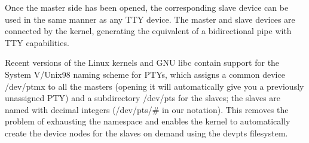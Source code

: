 Once the master side has been opened, the corresponding slave device
can be used in the same manner as any TTY device.  The master and
slave devices are connected by the kernel, generating the equivalent
of a bidirectional pipe with TTY capabilities.

Recent versions of the Linux kernels and GNU libc contain support for
the System V/Unix98 naming scheme for PTYs, which assigns a common
device {\file /dev/ptmx\/} to all the masters (opening it will
automatically give you a previously unassigned PTY) and a subdirectory
{\file /dev/pts\/} for the slaves; the slaves are named with decimal
integers ({\file /dev/pts/$\#$\/} in our notation).  This removes the
problem of exhausting the namespace and enables the kernel to
automatically create the device nodes for the slaves on demand using
the {\file devpts\/} filesystem.


